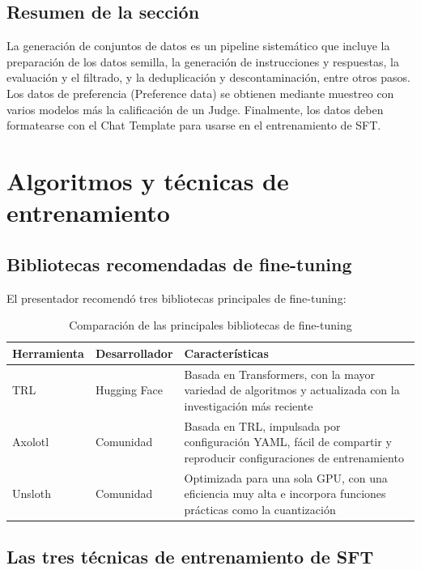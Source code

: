 \documentclass[a4paper]{article}
\begin{document}
\subsection{Resumen de la sección}

La generación de conjuntos de datos es un pipeline sistemático que incluye la preparación de los datos semilla, la generación de instrucciones y respuestas, la evaluación y el filtrado, y la deduplicación y descontaminación, entre otros pasos. Los datos de preferencia (Preference data) se obtienen mediante muestreo con varios modelos más la calificación de un Judge. Finalmente, los datos deben formatearse con el Chat Template para usarse en el entrenamiento de SFT.

\newpage
\section{Algoritmos y técnicas de entrenamiento}

\subsection{Bibliotecas recomendadas de fine-tuning}

El presentador recomendó tres bibliotecas principales de fine-tuning:

\begin{table}[H]
\centering
\caption{Comparación de las principales bibliotecas de fine-tuning}
\begin{tabular}{llp{7cm}}
\toprule
\textbf{Herramienta} & \textbf{Desarrollador} & \textbf{Características} \\
\midrule
TRL & Hugging Face & Basada en Transformers, con la mayor variedad de algoritmos y actualizada con la investigación más reciente \\
Axolotl & Comunidad & Basada en TRL, impulsada por configuración YAML, fácil de compartir y reproducir configuraciones de entrenamiento \\
Unsloth & Comunidad & Optimizada para una sola GPU, con una eficiencia muy alta e incorpora funciones prácticas como la cuantización \\
\bottomrule
\end{tabular}
\end{table}

\subsection{Las tres técnicas de entrenamiento de SFT}
\end{document}
